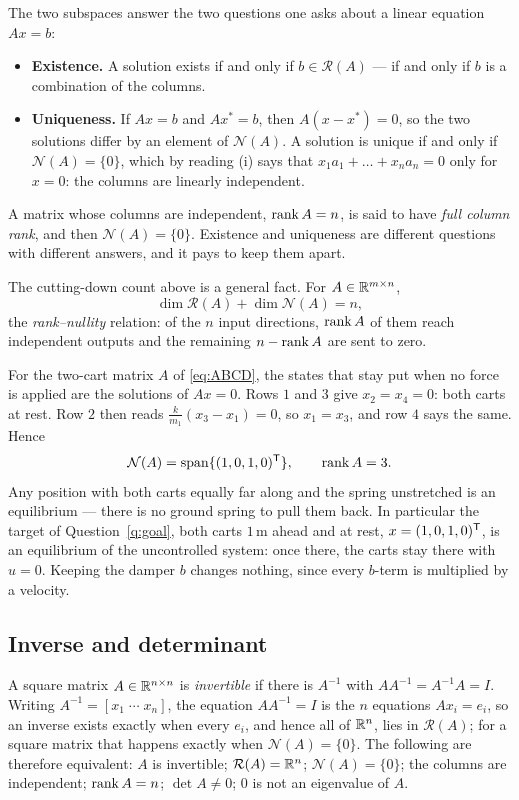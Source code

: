 \documentclass[11pt]{article}
\begin{document}
The two subspaces answer the two questions one asks about a linear equation
$Ax=b$:
\begin{itemize}[leftmargin=*,itemsep=2pt]
\item \textbf{Existence.} A solution exists if and only if $b\in\mathcal R(A)$ ---
if and only if $b$ is a combination of the columns.
\item \textbf{Uniqueness.} If $Ax=b$ and $Ax^{*}=b$, then $A(x-x^{*})=0$, so the
two solutions differ by an element of $\mathcal N(A)$. A solution is unique if
and only if $\mathcal N(A)=\{0\}$, which by reading (i) says that
$x_1a_1+\dots+x_na_n=0$ only for $x=0$: the columns are linearly independent.
\end{itemize}
A matrix whose columns are independent, $\operatorname{rank} A=n$, is said to have \emph{full
column rank}, and then $\mathcal N(A)=\{0\}$. Existence and uniqueness are
different questions with different answers, and it pays to keep them apart.

\begin{remark}
The cutting-down count above is a general fact. For $A\in\mathbb{R}^{m\times n}$,
\[
   \dim\mathcal R(A)+\dim\mathcal N(A) = n ,
\]
the \emph{rank--nullity} relation: of the $n$ input directions, $\operatorname{rank} A$ of them
reach independent outputs and the remaining $n-\operatorname{rank} A$ are sent to zero.
\end{remark}

\begin{example}\label{ex:cartnull}
For the two-cart matrix $A$ of \eqref{eq:ABCD}, the states that stay put when no
force is applied are the solutions of $Ax=0$. Rows $1$ and $3$ give $x_2=x_4=0$:
both carts at rest. Row $2$ then reads $\frac{k}{m_1}(x_3-x_1)=0$, so $x_1=x_3$, and
row $4$ says the same. Hence
\[
   \mathcal N(A) = \operatorname{span}\{(1,0,1,0)^{\mathsf{T}}\},
   \qquad \operatorname{rank} A = 3 .
\]
Any position with both carts equally far along and the spring unstretched is an
equilibrium --- there is no ground spring to pull them back. In particular the
target of Question~\ref{q:goal}, both carts $1$\,m ahead and at rest,
$x=(1,0,1,0)^{\mathsf{T}}$, is an equilibrium of the uncontrolled system: once there, the
carts stay there with $u=0$. Keeping the damper $b$ changes nothing, since every
$b$-term is multiplied by a velocity.
\end{example}

\subsection{Inverse and determinant}
A square matrix $A\in\mathbb{R}^{n\times n}$ is \emph{invertible} if there is $A^{-1}$ with
$AA^{-1}=A^{-1}A=I$. Writing $A^{-1}=[x_1\;\cdots\;x_n]$, the equation $AA^{-1}=I$ is
the $n$ equations $Ax_i=e_i$, so an inverse exists exactly when every $e_i$, and
hence all of $\mathbb{R}^{n}$, lies in $\mathcal R(A)$; for a square matrix that happens
exactly when $\mathcal N(A)=\{0\}$. The following are therefore equivalent:
$A$ is invertible; $\mathcal R(A)=\mathbb{R}^{n}$; $\mathcal N(A)=\{0\}$; the columns are
independent; $\operatorname{rank} A=n$; $\det A\neq0$; $0$ is not an eigenvalue of $A$.
\end{document}
